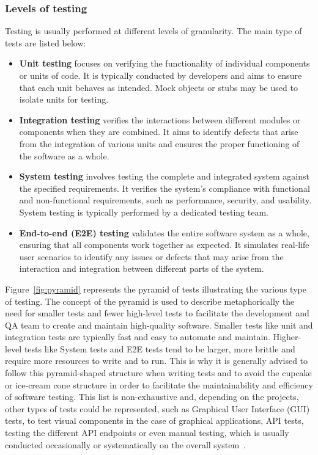 \subsubsection{Levels of testing}

Testing is usually performed at different levels of granularity. The main type of tests are listed below:

\begin{itemize}[label={}]
    \item \textbf{Unit testing} focuses on verifying the functionality of individual components or units of code. It is typically conducted by developers and aims to ensure that each unit behaves as intended. Mock objects or stubs may be used to isolate units for testing.

    \item \textbf{Integration testing} verifies the interactions between different modules or components when they are combined. It aims to identify defects that arise from the integration of various units and ensures the proper functioning of the software as a whole.

    \item \textbf{System testing} involves testing the complete and integrated system against the specified requirements. It verifies the system's compliance with functional and non-functional requirements, such as performance, security, and usability. System testing is typically performed by a dedicated testing team.
    
    \item \textbf{End-to-end (E2E) testing} validates the entire software system as a whole, ensuring that all components work together as expected. It simulates real-life user scenarios to identify any issues or defects that may arise from the interaction and integration between different parts of the system.
\end{itemize}

Figure~\ref{fig:pyramid} represents the pyramid of tests illustrating the various type of testing. The concept of the pyramid is used to describe metaphorically the need for smaller tests and fewer high-level tests to facilitate the development and QA team to create and maintain high-quality software. Smaller tests like unit and integration tests are typically fast and easy to automate and maintain. Higher-level tests like System tests and E2E tests tend to be larger, more brittle and require more resources to write and to run. This is why it is generally advised to follow this pyramid-shaped structure when writing tests and to avoid the cupcake or ice-cream cone structure in order to facilitate the maintainability and efficiency of software testing. This list is non-exhaustive and, depending on the projects, other types of tests could be represented, such as Graphical User Interface (GUI) tests, to test visual components in the case of graphical applications, API tests, testing the different API endpoints or even manual testing, which is usually conducted occasionally or systematically on the overall system~\cite{contan2018test}.


